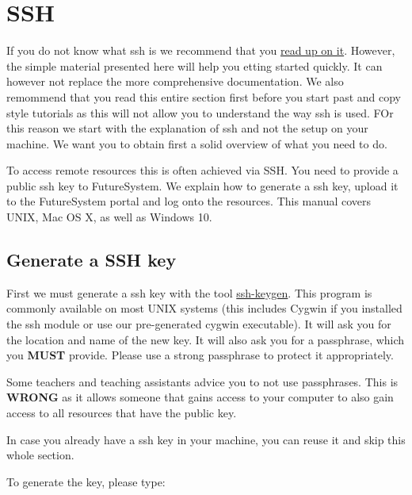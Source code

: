 \chapter{SSH}
\label{C:ssh}

If you do not know what ssh is we recommend that you
\href{http://openssh.com/manual.html}{read up on it}. However, the
simple material presented here will help you etting started quickly. It
can however not replace the more comprehensive documentation. We also
remommend that you read this entire section first before you start
past and copy style tutorials as this will not allow you to understand
the way ssh is used. FOr this reason we start with the explanation of
ssh and not the setup on your machine. We want you to obtain first a
solid overview of what you need to do.

To access remote resources this is often achieved via SSH. You need to
provide a public ssh key to FutureSystem. We explain how to generate a
ssh key, upload it to the FutureSystem portal and log onto the
resources. This manual covers UNIX, Mac OS X, as well as Windows 10.



\section{Generate a SSH key}
\label{s:generate-a-ssh-key}

First we must generate a ssh key with the tool
\href{http://linux.die.net/man/1/ssh-keygen}{ssh-keygen}. This program
is commonly available on most UNIX systems (this includes Cygwin if
you installed the ssh module or use our pre-generated cygwin
executable). It will ask you for the location and name of the new
key. It will also ask you for a passphrase, which you \textbf{MUST}
provide. Please use a strong passphrase to protect it
appropriately.

\begin{WARNING}
  Some teachers and teaching assistants advice you to not use
  passphrases. This is \textbf{WRONG} as it allows someone that gains
  access to your computer to also gain access to all resources that
  have the public key.
\end{WARNING}

In case you already have a ssh key in your machine, you can reuse it and
skip this whole section.

To generate the key, please type:

